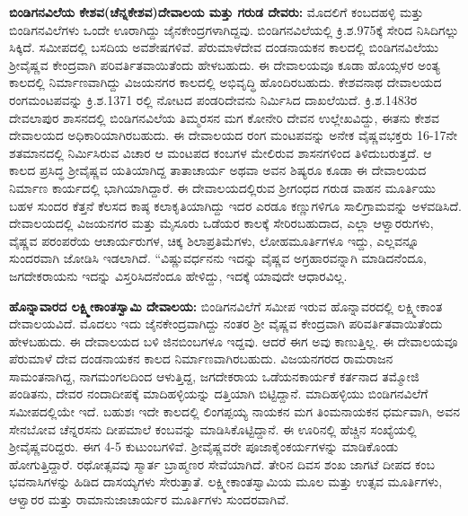\textbf{ಬಿಂಡಿಗನವಿಲೆಯ ಕೇಶವ(ಚೆನ್ನಕೇಶವ)ದೇವಾಲಯ ಮತ್ತು ಗರುಡ ದೇವರು:} ಮೊದಲಿಗೆ ಕಂಬದಹಳ್ಳಿ ಮತ್ತು ಬಿಂಡಿಗನವಿಲೆಗಳು ಒಂದೇ ಊರಾಗಿದ್ದು ಜೈನಕೇಂದ್ರಗಳಾಗಿದ್ದವು. ಬಿಂಡಿಗನವಿಲೆಯಲ್ಲಿ ಕ್ರಿ.ಶ.975ಕ್ಕೆ ಸೇರಿದ ನಿಸಿದಿಗಲ್ಲು ಸಿಕ್ಕಿದೆ. ಸಮೀಪದಲ್ಲಿ ಬಸದಿಯ ಅವಶೇಷಗಳಿವೆ. ಪೆರುಮಾಳೆದೇವ ದಂಡನಾಯಕನ ಕಾಲದಲ್ಲಿ ಬಿಂಡಿಗನವಿಲೆಯು ಶ‍್ರೀವೈಷ್ಣವ ಕೇಂದ್ರವಾಗಿ ಪರಿವರ್ತಿತವಾಯಿತೆಂದು ಹೇಳಬಹುದು. ಈ ದೇವಾಲಯವೂ ಕೂಡಾ ಹೊಯ್ಸಳರ ಅಂತ್ಯ ಕಾಲದಲ್ಲಿ ನಿರ್ಮಾಣವಾಗಿದ್ದು ವಿಜಯನಗರ ಕಾಲದಲ್ಲಿ ಅಭಿವೃದ್ಧಿ ಹೊಂದಿರಬಹುದು. ಕೇಶವನಾಥ ದೇವಾಲಯದ ರಂಗಮಂಟಪವನ್ನು ಕ್ರಿ.ಶ.1371 ರಲ್ಲಿ ನೋಟದ ಪಂಡರಿದೇವನು ನಿರ್ಮಿಸಿದ ದಾಖಲೆಯಿದೆ. ಕ್ರಿ.ಶ.1483ರ ದೇವಲಾಪುರ ಶಾಸನದಲ್ಲಿ ಬಿಂಡಿಗನವಿಲೆಯ ತಿಮ್ಮರಸನ ಮಗ ಕೋನೇರಿ ದೇವನ ಉಲ್ಲೇಖವಿದ್ದು, ಈತನು ಕೇಶವ ದೇವಾಲಯದ ಅಧಿಕಾರಿಯಾಗಿರಬಹುದು. ಈ ದೇವಾಲಯದ ರಂಗ ಮಂಟಪವನ್ನು ಅನೇಕ ವೈಷ್ಣವಭಕ್ತರು 16-17ನೇ ಶತಮಾನದಲ್ಲಿ ನಿರ್ಮಿಸಿರುವ ವಿಚಾರ ಆ ಮಂಟಪದ ಕಂಬಗಳ ಮೇಲಿರುವ ಶಾಸನಗಳಿಂದ ತಿಳಿದುಬರುತ್ತದೆ. ಆ ಕಾಲದ ಪ್ರಸಿದ್ಧ ಶ‍್ರೀವೈಷ್ಣವ ಯತಿಯಾಗಿದ್ದ ತಾತಾಚಾರ್ಯ ಅಥವಾ ಅವನ ಶಿಷ್ಯರೂ ಕೂಡಾ ಈ ದೇವಾಲಯದ ನಿರ್ಮಾಣ ಕಾರ್ಯದಲ್ಲಿ ಭಾಗಿಯಾಗಿದ್ದಾರೆ. ಈ ದೇವಾಲಯದಲ್ಲಿರುವ ಶ‍್ರೀಗಂಧದ ಗರುಡ ವಾಹನ ಮೂರ್ತಿಯು ಬಹಳ ಸುಂದರ ಕೆತ್ತನೆ ಕೆಲಸದ ಕಾಷ್ಠ ಕಲಾಕೃತಿಯಾಗಿದ್ದು ಇದರ ಎರಡೂ ಕಣ್ಣುಗಳಿಗೂ ಸಾಲಿಗ್ರಾಮವನ್ನು ಅಳವಡಿಸಿದೆ. ದೇವಾಲಯದಲ್ಲಿ ವಿಜಯನಗರ ಮತ್ತು ಮೈಸೂರು ಒಡೆಯರ ಕಾಲಕ್ಕೆ ಸೇರಿರಬಹುದಾದ, ಎಲ್ಲಾ ಆಳ್ವಾರರುಗಳು, ವೈಷ್ಣವ ಪರಂಪರೆಯ ಆಚಾರ್ಯರುಗಳ, ಚಿಕ್ಕ ಶಿಲಾಪ್ರತಿಮೆಗಳು, ಲೋಹಮೂರ್ತಿಗಳೂ ಇದ್ದು, ಎಲ್ಲವನ್ನೂ ಸುಂದರವಾಗಿ ಜೋಡಿಸಿ ಇಡಲಾಗಿದೆ. “ವಿಷ್ಣುವರ್ಧನನು ಇದನ್ನು ವೈಷ್ಣವ ಅಗ್ರಹಾರವನ್ನಾಗಿ ಮಾಡಿದನೆಂದೂ, ಜಗದೇಕರಾಯನು ಇದನ್ನು ವಿಸ್ತರಿಸಿದನೆಂದೂ ಹೇಳಿದ್ದು, ಇದಕ್ಕೆ ಯಾವುದೇ ಆಧಾರವಿಲ್ಲ.

\textbf{ಹೊನ್ನಾವಾರದ ಲಕ್ಷ್ಮೀಕಾಂತಸ್ವಾಮಿ ದೇವಾಲಯ:} ಬಿಂಡಿಗನವಿಲೆಗೆ ಸಮೀಪ ಇರುವ ಹೊನ್ನಾವರದಲ್ಲಿ ಲಕ್ಷ್ಮೀಕಾಂತ ದೇವಾಲಯವಿದೆ. ಮೊದಲು ಇದು ಜೈನಕೇಂದ್ರವಾಗಿದ್ದು ನಂತರ ಶ‍್ರೀ ವೈಷ್ಣವ ಕೇಂದ್ರವಾಗಿ ಪರಿವರ್ತಿತವಾಯಿತೆಂದು ಹೇಳಬಹುದು. ಈ ದೇವಾಲಯದ ಬಳಿ ಜಿನಬಿಂಬಗಳೂ ಇದ್ದವು. ಆದರೆ ಈಗ ಅವು ಕಾಣುತ್ತಿಲ್ಲ. ಈ ದೇವಾಲಯವೂ ಪೆರುಮಾಳೆ ದೇವ ದಂಡನಾಯಕನ ಕಾಲದ ನಿರ್ಮಾಣವಾಗಿರಬಹುದು. ವಿಜಯನಗರದ ರಾಮರಾಜನ ಸಾಮಂತನಾಗಿದ್ದ, ನಾಗಮಂಗಲದಿಂದ ಆಳುತ್ತಿದ್ದ, ಜಗದೇಕರಾಯ ಒಡೆಯನಕಾರ್ಯಕೆ ಕರ್ತನಾದ ತಮ್ಮೋಜಿ ಪಂಡಿತನು, ದೇವರ ನಂದಾದೀಪಕ್ಕೆ ಮಾದಿಹಳ್ಳಿಯನ್ನು ದತ್ತಿಯಾಗಿ ಬಿಟ್ಟಿದ್ದಾನೆ. ಮಾದಿಹಳ್ಳಿಯು ಬಿಂಡಿಗನವಿಲೆಗೆ ಸಮೀಪದಲ್ಲಿಯೇ ಇದೆ. ಬಹುಶಃ ಇದೇ ಕಾಲದಲ್ಲಿ ಲಿಂಗಪ್ಪಯ್ಯ ನಾಯಕನ ಮಗ ತಿಂಮನಾಯಕನ ಧರ್ಮವಾಗಿ, ಅವನ ಸೇನಬೋವ ಚೆನ್ನರಸನು ದೀಪಮಾಲೆ ಕಂಬವನ್ನು ಮಾಡಿಸಿಕೊಟ್ಟಿದ್ದಾನೆ. ಈ ಊರಿನಲ್ಲಿ ಹೆಚ್ಚಿನ ಸಂಖ್ಯೆಯಲ್ಲಿ ಶ‍್ರೀವೈಷ್ಣವರಿದ್ದರು. ಈಗ 4-5 ಕುಟುಂಬಗಳಿವೆ. ಶ‍್ರೀವೈಷ್ಣವರೇ ಪೂಜಾಕೈಂಕರ್ಯಗಳನ್ನು ಮಾಡಿಕೊಂಡು ಹೋಗುತ್ತಿದ್ದಾರೆ. ರಥೋತ್ಸವವು ಸ್ಮಾರ್ತ ಬ್ರಾಹ್ಮಣರ ಸೇವೆಯಾಗಿದೆ. ತೇರಿನ ದಿವಸ ಶಂಖ ಜಾಗಟೆ ದೀಪದ ಕಂಬ ಭವನಾಸಿಗಳನ್ನು ಹಿಡಿದ ದಾಸಯ್ಯಗಳು ಸೇರುತ್ತಾತೆ. ಲಕ್ಷ್ಮೀಕಾಂತಸ್ವಾಮಿಯ ಮೂಲ ಮತ್ತು ಉತ್ಸವ ಮೂರ್ತಿಗಳು, ಆಳ್ವಾರರ ಮತ್ತು ರಾಮಾನುಜಾಚಾರ್ಯರ ಮೂರ್ತಿಗಳು ಸುಂದರವಾಗಿವೆ.

